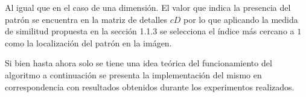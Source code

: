 \par Al igual que en el caso de una dimensi\'on. El valor que indica la presencia del patr\'on se encuentra en la matriz de detalles $cD$ por lo que aplicando la medida de similitud propuesta en la secci\'on 1.1.3 se selecciona el \'indice m\'as cercano a $1$ como la localizaci\'on del patr\'on en la im\'agen.\\

\par Si bien hasta ahora solo se tiene una idea te\'orica del funcionamiento del algoritmo a continuaci\'on se presenta la implementaci\'on del mismo en correspondencia con resultados obtenidos durante los experimentos realizados.
